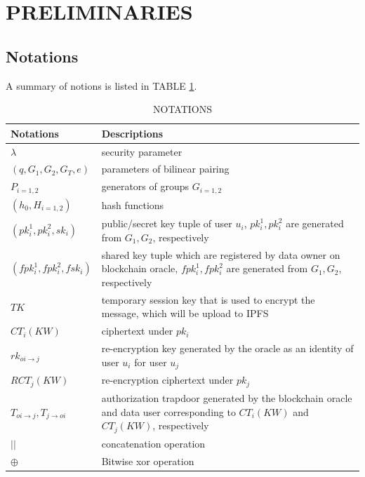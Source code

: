 \documentclass[journal,10pt]{IEEEtran}
\begin{document}
\section{PRELIMINARIES}
\subsection{Notations}
A summary of notions is listed in TABLE \ref{tab:notation}.

\begin{table}[t!]
\caption{NOTATIONS}
\label{tab:notation}
\centering
\begin{tabular}{ |p{2.3cm}|p{5.5cm}|}
 \hline
 Notations & Descriptions \\
 \hline
 $\lambda$ & security parameter \\
 \hline
 $(q, G_1, G_2, G_T, e)$ & parameters of bilinear pairing \\
 \hline
 $P_{i=1,2}$ & generators of groups $G_{i=1,2}$ \\
 \hline
 $(h_0, H_{i=1,2})$ & hash functions \\
 \hline
 $(pk_i^1, pk_i^2, sk_i)$ & public/secret key tuple of user $u_i$, $pk_i^1, pk_i^2$ are generated from $G_1, G_2$, respectively \\
 \hline
 $(fpk_i^1, fpk_i^2, fsk_i)$ & shared key tuple which are registered by data owner on blockchain oracle, $fpk_i^1, fpk_i^2$ are generated from $G_1, G_2$, respectively  \\
 \hline
  $TK$ & temporary session key that is used to encrypt the message, which will be upload to IPFS \\
 \hline
 $CT_i(KW)$ & ciphertext under $pk_i$ \\
 \hline
 $rk_{oi \to j}$ & re-encryption key generated by the oracle as an identity of user $u_i$ for user $u_j$ \\
 \hline
 $RCT_j(KW)$ & re-encryption ciphertext under $pk_j$ \\
 \hline
 $T_{oi \to j}, T_{j \to oi}$ & authorization trapdoor generated by the blockchain oracle and data user corresponding to $CT_i(KW)$ and $CT_j(KW)$, respectively \\
 \hline
 $||$ & concatenation operation \\
 \hline
 $\oplus$ & Bitwise xor operation \\
 \hline
\end{tabular}
\end{table}
\end{document}
